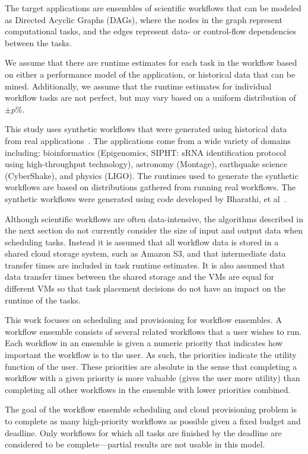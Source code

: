 \documentclass[conference]{IEEEtran}
\begin{document}
The target applications are ensembles of scientific workflows that can be modeled as Directed Acyclic Graphs (DAGs), where the nodes in the graph represent computational tasks, and the edges represent data- or control-flow dependencies between the tasks.

We assume that there are runtime estimates for each task in the workflow based on either a performance model of the application, or historical data that can be mined. Additionally, we assume that the runtime estimates for individual workflow tasks are not perfect, but may vary based on a uniform distribution of $\pm p\%$.

This study uses synthetic workflows that were generated using historical data from real applications~\cite{Bharathi2008}. The applications come from a wide variety of domains including: bioinformatics (Epigenomics, SIPHT: sRNA identification protocol using high-throughput technology), astronomy (Montage), earthquake science (CyberShake), and physics (LIGO). The runtimes used to generate the synthetic workflows are based on distributions gathered from running real workflows. The synthetic workflows were generated using code developed by Bharathi, et al~\cite{WorkflowGenerator}.

Although scientific workflows are often data-intensive, the algorithms described in the next section do not currently consider the size of input and output data when scheduling tasks. Instead it is assumed that all workflow data is stored in a shared cloud storage system, such as Amazon S3, and that intermediate data transfer times are included in task runtime estimates. It is also assumed that data transfer times between the shared storage and the VMs are equal for different VMs so that task placement decisions do not have an impact on the runtime of the tasks.

This work focuses on scheduling and provisioning for workflow ensembles. A workflow ensemble consists of several related workflows that a user wishes to run. Each workflow in an ensemble is given a numeric priority that indicates how important the workflow is to the user. As such, the priorities indicate the utility function of the user. These priorities are absolute in the sense that completing a workflow with a given priority is more valuable (gives the user more utility) than completing all other workflows in the ensemble with lower priorities combined.

The goal of the workflow ensemble scheduling and cloud provisioning problem is to complete as many high-priority workflows as possible given a fixed budget and deadline. Only workflows for which all tasks are finished by the deadline are considered to be complete---partial results are not usable in this model.
\end{document}
